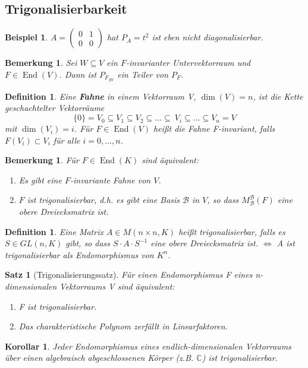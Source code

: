 \documentclass[12pt,a4paper]{article}
\theoremstyle{plain}
\newtheorem{Satz}[Theorem]{Satz}
\newtheorem{Korollar}[Theorem]{Korollar}
\newtheorem{Definition}[Theorem]{Definition}
\newtheorem{Bemerkung}[Theorem]{Bemerkung}
\newtheorem{Beispiel}[Theorem]{Beispiel}
\newcommand{\herv}[1]{{\emph{\textbf{#1}}}}
\newcommand{\C}{\mathbb{C}}
\numberwithin{equation}{section}
\begin{document}
\subsection{Trigonalisierbarkeit}
\begin{Beispiel} $A=\begin{pmatrix} 0 & 1 \\ 0 & 0\end{pmatrix}$ hat $P_A=t^2$ ist eben nicht diagonalisierbar.
\end{Beispiel}
\begin{Bemerkung}
Sei $W\subseteq V$ ein $F$-invarianter Untervektorraum und $F\in\operatorname{End}(V)$. Dann ist $P_{F_{|W}}$ ein Teiler von $P_F$.
\end{Bemerkung}
\begin{Definition}
Eine \herv{Fahne} in einem Vektorraum V, $\dim(V)=n$, ist die Kette geschachtelter Vektorräume \[\{0\}=V_0\subseteq V_1 \subseteq V_2 \subseteq \ldots \subseteq\ V_i \subseteq\ldots\subseteq V_n=V \] mit $\dim(V_i)=i$. Für $F\in\operatorname{End}(V)$ heißt die Fahne F-invariant, falls $F(V_i)\subset V_i$ für alle  $i=0,\ldots,n$.
\end{Definition}
\begin{Bemerkung}
Für $F\in\operatorname{End}(K)$ sind äquivalent:
\begin{enumerate}
\renewcommand{\labelenumi}{\roman{enumi})}
\item Es gibt eine $F$-invariante Fahne von $V$.
\item $F$ ist trigonalisierbar, d.h. es gibt eine Basis $\mathcal{B}$ in $V$, so dass $M_\mathcal{B}^\mathcal{B}(F)$ eine obere Dreiecksmatrix ist.
\end{enumerate}
\end{Bemerkung}
\begin{Definition}
Eine Matrix $A\in M(n\times n,K)$ heißt trigonalisierbar, falls es $S\in GL(n,K)$ gibt, so dass $S\cdot A\cdot S^{-1}$ eine obere Dreiecksmatrix ist. $\Leftrightarrow$ A ist trigonalisierbar als Endomorphismus von $K^n$.
\end{Definition}
\begin{Satz}[Trigonalisierungssatz]
Für einen Endomorphismus F eines n-dimensionalen Vektorraums V sind äquivalent:
\begin{enumerate}
\renewcommand{\labelenumi}{\emph{\roman{enumi})}}
\item F ist trigonalisierbar.
\item Das charakteristische Polynom zerfällt in Linearfaktoren.
\end{enumerate}
\end{Satz}
\begin{Korollar}
Jeder Endomorphismus eines endlich-dimensionalen Vektorraums über einen algebraisch abgeschlossenen Körper (z.B. $\C$) ist trigonalisierbar.
\end{Korollar}
\end{document}
